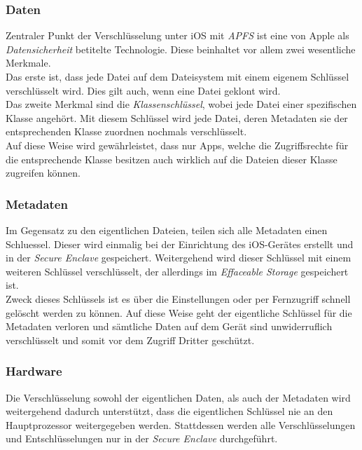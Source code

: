 \subsubsection{Daten}
Zentraler Punkt der Verschlüsselung unter iOS mit \textit{APFS} ist eine von Apple als \textit{Datensicherheit} betitelte Technologie\cite[S. 48 ff]{Apple2020}. Diese beinhaltet vor allem zwei wesentliche Merkmale.\\
Das erste ist, dass jede Datei auf dem Dateisystem mit einem eigenem Schlüssel verschlüsselt wird. Dies gilt auch, wenn eine Datei geklont wird\cite[S. 49]{Apple2020}.\\
Das zweite Merkmal sind die \textit{Klassenschlüssel}, wobei jede Datei einer spezifischen Klasse angehört. Mit diesem Schlüssel wird jede Datei, deren Metadaten sie der entsprechenden Klasse zuordnen nochmals verschlüsselt\cite[S. 49]{Apple2020}.\\
Auf diese Weise wird gewährleistet, dass nur Apps, welche die Zugriffsrechte für die entsprechende Klasse besitzen auch wirklich auf die Dateien dieser Klasse zugreifen können.

\subsubsection{Metadaten}
Im Gegensatz zu den eigentlichen Dateien, teilen sich alle Metadaten einen Schluessel\cite[S. 50]{Apple2020}. Dieser wird einmalig bei der Einrichtung des iOS-Gerätes erstellt und in der \textit{Secure Enclave} gespeichert. Weitergehend wird dieser Schlüssel mit einem weiteren Schlüssel verschlüsselt, der allerdings im \textit{Effaceable Storage} gespeichert ist.\\
Zweck dieses Schlüssels ist es über die Einstellungen oder per Fernzugriff schnell gelöscht werden zu können. Auf diese Weise geht der eigentliche Schlüssel für die Metadaten verloren und sämtliche Daten auf dem Gerät sind unwiderruflich verschlüsselt und somit vor dem Zugriff Dritter geschützt.

\subsubsection{Hardware}
Die Verschlüsselung sowohl der eigentlichen Daten, als auch der Metadaten wird weitergehend dadurch unterstützt, dass die eigentlichen Schlüssel nie an den Hauptprozessor weitergegeben werden\cite[S. 50]{Apple2020}. Stattdessen werden alle Verschlüsselungen und Entschlüsselungen nur in der \textit{Secure Enclave} durchgeführt.

